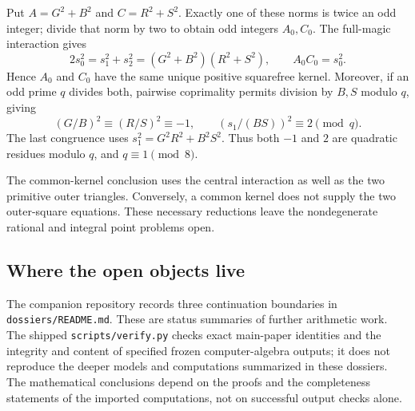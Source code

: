 Put $A=G^2+B^2$ and $C=R^2+S^2$. Exactly one of these norms is twice an
odd integer; divide that norm by two to obtain odd integers $A_0,C_0$.
The full-magic interaction gives
\[
2s_0^2=s_1^2+s_2^2
 =(G^2+B^2)(R^2+S^2),\qquad A_0C_0=s_0^2.
\]
Hence $A_0$ and $C_0$ have the same unique positive squarefree kernel.
Moreover, if an odd prime $q$ divides both, pairwise coprimality permits
division by $B,S$ modulo $q$, giving
\[
(G/B)^2\equiv(R/S)^2\equiv-1,\qquad
(s_1/(BS))^2\equiv2\pmod q.
\]
The last congruence uses $s_1^2=G^2R^2+B^2S^2$. Thus both $-1$ and $2$
are quadratic residues modulo $q$, and $q\equiv1\pmod8$.

The common-kernel conclusion uses the central interaction as well as the
two primitive outer triangles. Conversely, a common kernel does not
supply the two outer-square equations. These necessary reductions leave
the nondegenerate rational and integral point problems open.

\subsection{Where the open objects live}

The companion repository records three continuation boundaries in
\texttt{dossiers/README.md}. These are status summaries of further
arithmetic work. The shipped \texttt{scripts/verify.py} checks exact
main-paper identities and the integrity and content of specified frozen
computer-algebra outputs; it does not reproduce the deeper models and
computations summarized in these dossiers. The mathematical conclusions
depend on the proofs and the completeness statements of the imported
computations, not on successful output checks alone.


